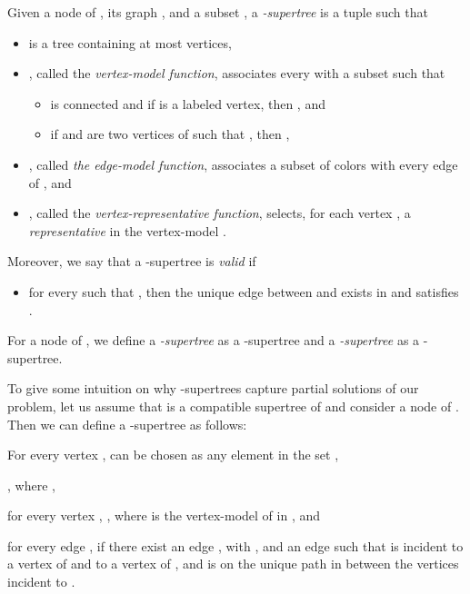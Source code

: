 \begin{definition}\label{def:supertree}
Given a node  of , its graph , and  a subset , a  \emph{-supertree} is a tuple  such that
\begin{itemize}
\item[]  is a tree containing at most  vertices,
\item[] , called the \emph{vertex-model function}, associates every  with a subset  such that
\begin{itemize}
\item[]  is connected and if  is a labeled vertex, then , and
\item[] if  and  are two vertices of  such that , then ,
\end{itemize}

\item[] , called \emph{the edge-model function}, associates a subset of colors with every edge of , and

\item[] , called the \emph{vertex-representative function}, selects, for each vertex , a \emph{representative}  in the vertex-model .
\end{itemize}

\noindent Moreover, we say that a -supertree  is \emph{valid} if
\begin{itemize}
\item[] for every  such that , then the unique edge  between  and  exists in  and satisfies .
\end{itemize}

\noindent For a node  of , we define a \emph{-supertree} as a -supertree and a \emph{-supertree} as a -supertree.
\end{definition}




To give some intuition on why -supertrees capture partial solutions of our problem, let us assume that  is a compatible supertree of  and consider a node  of . Then
we can define a -supertree  as follows:



\begin{tight_enumerate}
\item [] For every vertex ,  can be chosen as any element in the set ,
\item [] , where ,
\item [] for every vertex , ,  where  is the vertex-model of  in , and
\item[]  for every edge ,
 if
there exist an edge , with  , and
an edge 
such that  is incident to a vertex of  and to a vertex of , and
 is on the unique path  in  between the vertices incident to .
\end{tight_enumerate}

